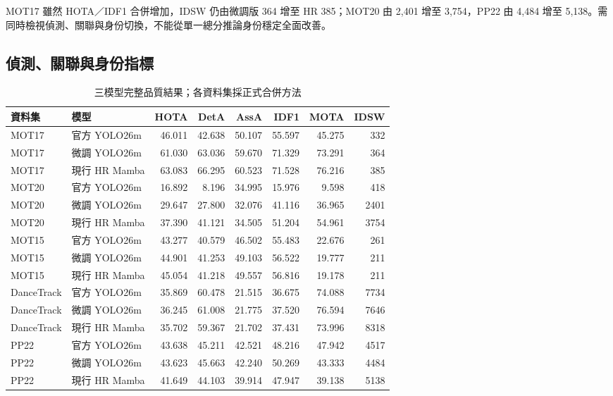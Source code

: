MOT17 雖然 HOTA／IDF1 合併增加，IDSW 仍由微調版 364 增至 HR 385；MOT20 由 2,401 增至 3,754，PP22 由 4,484 增至 5,138。需同時檢視偵測、關聯與身份切換，不能從單一總分推論身份穩定全面改善。

\subsection{偵測、關聯與身份指標}
\begin{table}[H]
\caption{三模型完整品質結果；各資料集採正式合併方法}
\small
\noindent\begin{tabularx}{\textwidth}{@{}P{22mm}Yrrrrrr@{}}
\toprule
資料集 & 模型 & HOTA & DetA & AssA & IDF1 & MOTA & IDSW \\
\midrule
MOT17 & 官方 YOLO26m & 46.011 & 42.638 & 50.107 & 55.597 & 45.275 & 332 \\
MOT17 & 微調 YOLO26m & 61.030 & 63.036 & 59.670 & 71.329 & 73.291 & 364 \\
MOT17 & 現行 HR Mamba & 63.083 & 66.295 & 60.523 & 71.528 & 76.216 & 385 \\
MOT20 & 官方 YOLO26m & 16.892 & 8.196 & 34.995 & 15.976 & 9.598 & 418 \\
MOT20 & 微調 YOLO26m & 29.647 & 27.800 & 32.076 & 41.116 & 36.965 & 2401 \\
MOT20 & 現行 HR Mamba & 37.390 & 41.121 & 34.505 & 51.204 & 54.961 & 3754 \\
MOT15 & 官方 YOLO26m & 43.277 & 40.579 & 46.502 & 55.483 & 22.676 & 261 \\
MOT15 & 微調 YOLO26m & 44.901 & 41.253 & 49.103 & 56.522 & 19.777 & 211 \\
MOT15 & 現行 HR Mamba & 45.054 & 41.218 & 49.557 & 56.816 & 19.178 & 211 \\
DanceTrack & 官方 YOLO26m & 35.869 & 60.478 & 21.515 & 36.675 & 74.088 & 7734 \\
DanceTrack & 微調 YOLO26m & 36.245 & 61.008 & 21.775 & 37.520 & 76.594 & 7646 \\
DanceTrack & 現行 HR Mamba & 35.702 & 59.367 & 21.702 & 37.431 & 73.996 & 8318 \\
PP22 & 官方 YOLO26m & 43.638 & 45.211 & 42.521 & 48.216 & 47.942 & 4517 \\
PP22 & 微調 YOLO26m & 43.623 & 45.663 & 42.240 & 50.269 & 43.333 & 4484 \\
PP22 & 現行 HR Mamba & 41.649 & 44.103 & 39.914 & 47.947 & 39.138 & 5138 \\
\bottomrule
\end{tabularx}
\end{table}
